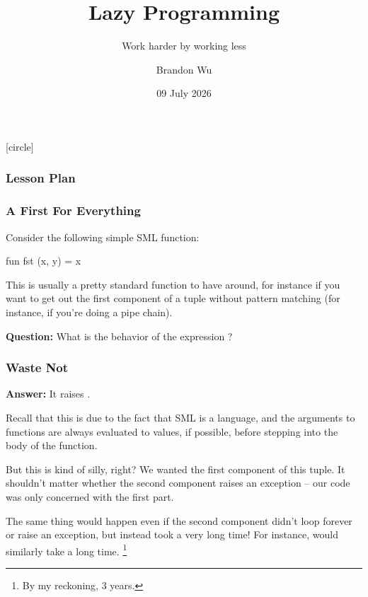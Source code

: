 \documentclass[aspectratio=169]{beamer}
\title{Lazy Programming} %
\subtitle{Work harder by working less} %
\date{09 July 2026} %
\author{Brandon Wu} %
\newif\ifcolorlambda
\begin{document}
\ifweb
    \renewcommand{\pause}{}
\fi

[circle]

{
\begin{frame}[plain]
    \colorlambdatrue
    \titlepage
\end{frame}
}


\begin{frame}[fragile]
  \frametitle{Lesson Plan}

  \tableofcontents
\end{frame}


\begin{frame}[fragile]
  \frametitle{A First For Everything}

  Consider the following simple SML function:
  \begin{codeblock}
    fun fst (x, y) = x
  \end{codeblock}

  \pause
  \vspace{\fill}

  This is usually a pretty standard function to have around, for instance
  if you want to get out the first component of a tuple without pattern
  matching (for instance, if you're doing a pipe chain).

  \pause
  \vspace{\fill}

  \textbf{Question:} What is the behavior of the expression ?
\end{frame}

\begin{frame}[fragile]
  \frametitle{Waste Not}

  \textbf{Answer:} It raises .

  \pause
  \vspace{\fill}

  Recall that this is due to the fact that SML is a  language,
  and the arguments to functions are always evaluated to values, if possible, before
  stepping into the body of the function.

  \pause
  \vspace{\fill}

  But this is kind of silly, right? We wanted the first component of this tuple. It
  shouldn't matter whether the second component raises an exception -- our code was
  only concerned with the first part.

  \pause
  \vspace{\fill}

  The same thing would happen even if the second component didn't loop forever or
  raise an exception, but instead took a very long time! For instance,
   would similarly take a long time.
  \footnote{By my reckoning, 3 years.}
\end{frame}
\end{document}

